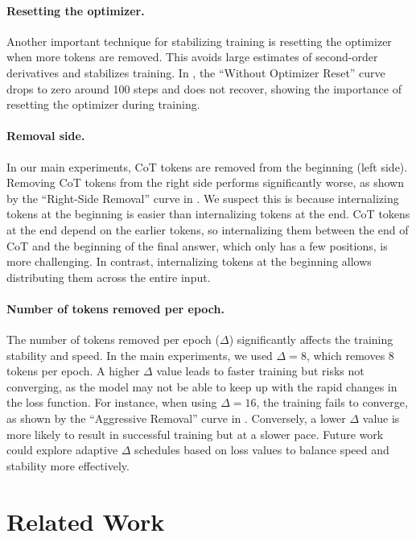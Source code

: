 \documentclass{article}
\begin{document}
\paragraph{Resetting the optimizer.}
Another important technique for stabilizing training is resetting the optimizer when more tokens are removed. This avoids large estimates of second-order derivatives and stabilizes training. In , the ``Without Optimizer Reset'' curve drops to zero around 100 steps and does not recover, showing the importance of resetting the optimizer during training.

\paragraph{Removal side.}
In our main experiments, CoT tokens are removed from the beginning (left side). Removing CoT tokens from the right side performs significantly worse, as shown by the ``Right-Side Removal'' curve in . We suspect this is because internalizing tokens at the beginning is easier than internalizing tokens at the end. CoT tokens at the end depend on the earlier tokens, so internalizing them between the end of CoT and the beginning of the final answer, which only has a few positions, is more challenging. In contrast, internalizing tokens at the beginning allows distributing them across the entire input.

\paragraph{Number of tokens removed per epoch.}
The number of tokens removed per epoch ($\Delta$) significantly affects the training stability and speed. In the main experiments, we used $\Delta=8$, which removes 8 tokens per epoch. A higher $\Delta$ value leads to faster training but risks not converging, as the model may not be able to keep up with the rapid changes in the loss function. For instance, when using $\Delta=16$, the training fails to converge, as shown by the ``Aggressive Removal'' curve in . Conversely, a lower $\Delta$ value is more likely to result in successful training but at a slower pace. Future work could explore adaptive $\Delta$ schedules based on loss values to balance speed and stability more effectively.



\section{Related Work}
\end{document}

